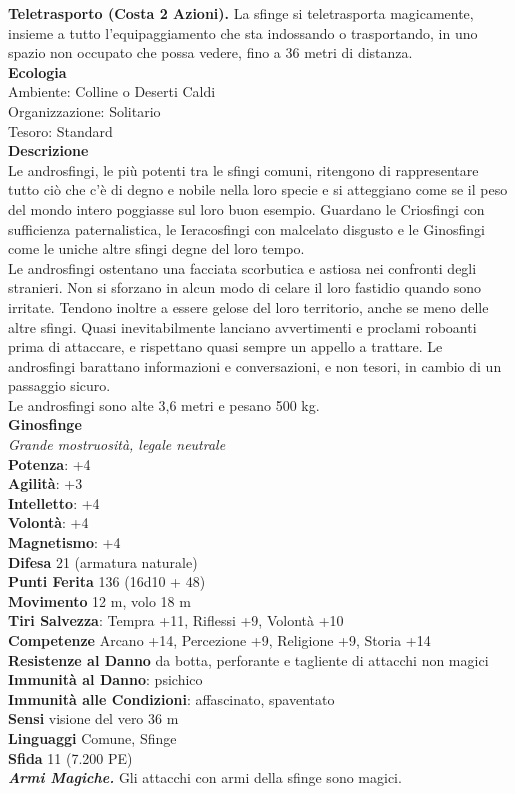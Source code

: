 \begin{multicols}{2}
\textbf{Teletrasporto (Costa 2 Azioni).} La sfinge si teletrasporta magicamente, insieme a tutto l'equipaggiamento che sta indossando o trasportando, in uno spazio non occupato che possa vedere, fino a 36 metri di distanza.\\
\textbf{Ecologia}\\
Ambiente: Colline o Deserti Caldi\\
Organizzazione: Solitario\\
Tesoro: Standard\\
\textbf{Descrizione}\\
Le androsfingi, le più potenti tra le sfingi comuni, ritengono di rappresentare tutto ciò che c'è di degno e nobile nella loro specie e si atteggiano come se il peso del mondo intero poggiasse sul loro buon esempio. Guardano le Criosfingi con sufficienza paternalistica, le Ieracosfingi con malcelato disgusto e le Ginosfingi come le uniche altre sfingi degne del loro tempo.\\

Le androsfingi ostentano una facciata scorbutica e astiosa nei confronti degli stranieri. Non si sforzano in alcun modo di celare il loro fastidio quando sono irritate. Tendono inoltre a essere gelose del loro territorio, anche se meno delle altre sfingi. Quasi inevitabilmente lanciano avvertimenti e proclami roboanti prima di attaccare, e rispettano quasi sempre un appello a trattare. Le androsfingi barattano informazioni e conversazioni, e non tesori, in cambio di un passaggio sicuro.\\
Le androsfingi sono alte 3,6 metri e pesano 500 kg.\\


\medskip\textbf{Ginosfinge}\\
\emph{Grande mostruosità, legale neutrale}\\
\textbf{Potenza}: +4\\
\textbf{Agilità}: +3\\
\textbf{Intelletto}: +4\\
\textbf{Volontà}: +4\\
\textbf{Magnetismo}: +4\\
\textbf{Difesa} 21 (armatura naturale)\\
\textbf{Punti Ferita} 136 (16d10 + 48)\\
\textbf{Movimento} 12 m, volo 18 m\\
\textbf{Tiri Salvezza}: Tempra +11, Riflessi +9, Volontà +10\\
\textbf{Competenze} Arcano +14, Percezione +9, Religione +9, Storia +14\\
\textbf{Resistenze al Danno} da botta, perforante e tagliente di attacchi non magici\\
\textbf{Immunità al Danno}: psichico\\
\textbf{Immunità alle Condizioni}: affascinato, spaventato\\
\textbf{Sensi} visione del vero 36 m\\
\textbf{Linguaggi} Comune, Sfinge\\
\textbf{Sfida} 11 (7.200 PE)\smallskip\\
\emph{\textbf{Armi Magiche.}} Gli attacchi con armi della sfinge sono magici.


\end{multicols}
